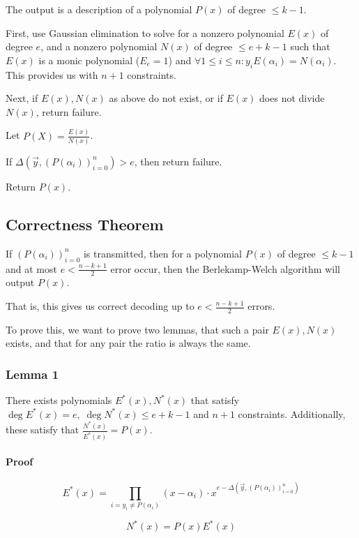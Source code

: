 \documentclass{idc_msc}
\begin{document}
The output is a description of a polynomial \(P(x)\) of degree \(\le k - 1\).

First, use Gaussian elimination to solve for a nonzero polynomial \(E(x)\) of degree \(e\), and a nonzero polynomial \(N(x)\) of degree \(\le e + k -1\) such that \(E(x)\) is a monic polynomial (\(E_e = 1\)) and \(\forall 1 \le i \le n : y_i E(\alpha_i) = N(\alpha_i)\).
This provides us with \(n + 1\) constraints.

Next, if \(E(x), N(x)\) as above do not exist, or if \(E(x)\) does not divide \(N(x)\), return failure.

Let \(P(X) = \frac{E(x)}{N(x)}\).

If \(\Delta(\vec{y}, (P(\alpha_i))^n_{i=0}) > e\), then return failure.

Return \(P(x)\).

\subsection{Correctness Theorem}

If \((P(\alpha_i))^n_{i=0}\) is transmitted, then for a polynomial \(P(x)\) of degree \(\le k-1\) and at most \(e < \frac{n-k+1}{2}\) error occur, then the Berlekamp-Welch algorithm will output \(P(x)\).

That is, this gives us correct decoding up to \(e < \frac{n-k+1}{2}\) errors.

To prove this, we want to prove two lemmas, that such a pair \(E(x), N(x)\) exists, and that for any pair the ratio is always the same.

\subsubsection{Lemma 1}

There exists polynomials \(E^*(x), N^*(x)\) that satisfy \(\deg E^*(x) = e,\; \deg N^*(x) \le e + k -1\) and \(n+1\) constraints.
Additionally, these satisfy that \(\frac{N^*(x)}{E^*(x)} = P(x)\).

\paragraph{Proof}

\[E^*(x) = \prod_{i = y_i \ne P(\alpha_i)} (x - \alpha_i) \cdot x^{e - \Delta(\vec{y}, (P(\alpha_i))^n_{i=0})}\]

\[N^*(x) = P(x)E^*(x)\]
\end{document}
